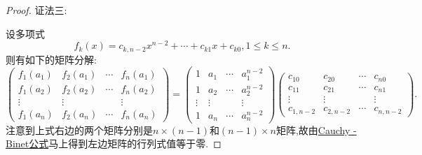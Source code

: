 \documentclass[../../main.tex]{subfiles}
\begin{document}
\begin{proof}
{\color{blue}证法三:}

设多项式
\[
f_k(x)=c_{k,n - 2}x^{n - 2}+\cdots+c_{k1}x + c_{k0},1\leqslant  k\leqslant  n.
\]
则有如下的矩阵分解:
\[
\begin{pmatrix}
f_1(a_1) & f_2(a_1) & \cdots & f_n(a_1)\\
f_1(a_2) & f_2(a_2) & \cdots & f_n(a_2)\\
\vdots & \vdots & & \vdots\\
f_1(a_n) & f_2(a_n) & \cdots & f_n(a_n)
\end{pmatrix}
=
\begin{pmatrix}
1 & a_1 & \cdots & a_1^{n - 2}\\
1 & a_2 & \cdots & a_2^{n - 2}\\
\vdots & \vdots & & \vdots\\
1 & a_n & \cdots & a_n^{n - 2}
\end{pmatrix}
\begin{pmatrix}
c_{10} & c_{20} & \cdots & c_{n0}\\
c_{11} & c_{21} & \cdots & c_{n1}\\
\vdots & \vdots & & \vdots\\
c_{1,n - 2} & c_{2,n - 2} & \cdots & c_{n,n - 2}
\end{pmatrix}.
\]
注意到上式右边的两个矩阵分别是\(n\times(n - 1)\)和\((n - 1)\times n\)矩阵,故由\hyperref[theorem:Cauchy-Binet公式]{Cauchy - Binet公式}马上得到左边矩阵的行列式值等于零.
\end{proof}
\end{document}
